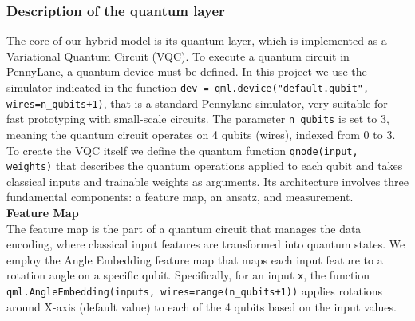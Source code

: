 \documentclass[10pt]{article}
\begin{document}
\subsubsection{Description of the quantum layer}
The core of our hybrid model is its quantum layer, which is implemented as a Variational Quantum Circuit (VQC). To execute a quantum circuit in PennyLane, a quantum device must be defined. In this project we use the simulator indicated in the function \texttt{dev = qml.device("default.qubit", wires=n\_qubits+1)}, that is a standard Pennylane simulator, very suitable for fast prototyping with small-scale circuits. The parameter \texttt{n\_qubits} is set to 3, meaning the quantum circuit operates on 4 qubits (wires), indexed from 0 to 3.
To create the VQC itself we define the quantum function \texttt{qnode(input, weights)} that describes the quantum operations applied to each qubit and takes classical inputs and trainable weights as arguments. Its architecture involves three fundamental components: a feature map, an ansatz, and measurement.\\ 

\noindent \textbf{Feature Map}\\
The feature map is the part of a quantum circuit that manages the data encoding, where classical input features are transformed into quantum states. 
We employ the Angle Embedding feature map that maps each input feature to a rotation angle on a specific qubit. Specifically, for an input \texttt{x}, the function \texttt{qml.AngleEmbedding(inputs, wires=range(n\_qubits+1))} applies rotations around X-axis (default value) to each of the 4 qubits based on the input values. \\
\end{document}
